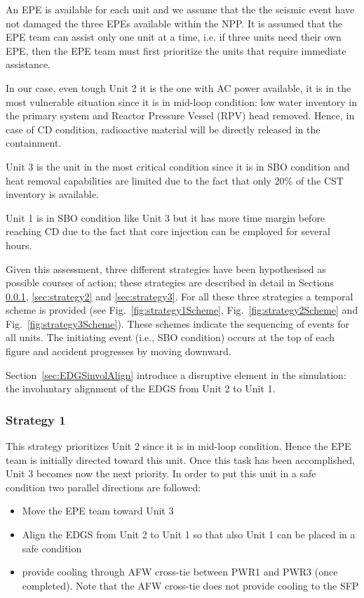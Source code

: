 An EPE is available for each unit and we assume that the the seismic event have not damaged the three EPEs available 
within the NPP. It is assumed that the EPE team can assist only one unit at a time, i.e. if three units need their 
own EPE, then the EPE team must first prioritize the units that require immediate assistance.
  
In our case, even tough Unit 2 it is the one with AC power available, it is in the most vulnerable situation since it 
is in mid-loop condition: low water inventory in the primary system and Reactor Pressure Vessel (RPV) head removed. 
Hence, in case of
CD condition, radioactive material will be directly released in the containment.

Unit 3 is the unit in the most critical condition since it is in SBO condition and heat removal capabilities are limited
due to the fact that only 20\% of the CST inventory is available.

Unit 1 is in SBO condition like Unit 3 but it has more time margin before reaching CD due to the fact that core injection 
can be employed for several hours.

Given this assessment, three different strategies have been hypothesised as possible courses of action; these strategies
are described in detail in Sections \ref{sec:strategy1}, \ref{sec:strategy2} and \ref{sec:strategy3}.
For all these three strategies a temporal scheme is provided (see Fig.~\ref{fig:strategy1Scheme}, 
Fig.~\ref{fig:strategy2Scheme} and Fig.~\ref{fig:strategy3Scheme}). These schemes indicate the sequencing of events 
for all units. The initiating event (i.e., SBO condition) occurs at the top of each figure and accident progresses 
by moving downward.

Section~\ref{sec:EDGSinvolAlign} introduce a disruptive element in the simulation: the involuntary alignment of the EDGS
from Unit 2 to Unit 1.


\subsubsection{Strategy 1}
\label{sec:strategy1}
This strategy prioritizes Unit 2 since it is in mid-loop condition. Hence the EPE team is initially directed toward
this unit. 
Once this task has been accomplished, Unit 3 becomes now the next priority. In order to put this unit in a safe 
condition two parallel directions are followed:

\begin{itemize}
  \item Move the EPE team toward Unit 3 
  \item Align the EDGS from Unit 2 to Unit 1 so that also Unit 1 can be placed in a safe condition
  \item provide cooling 
        through AFW cross-tie between PWR1 and PWR3 (once completed). Note that the AFW cross-tie does not provide 
        cooling to the SFP
\end{itemize}

